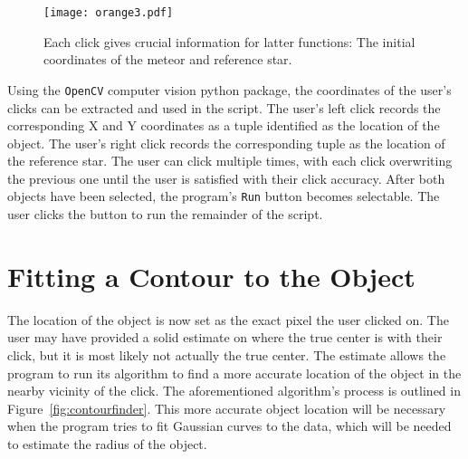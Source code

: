 \begin{figure}[h!]
	\centering
	\texttt{[image: orange3.pdf]}
	\caption{Each click gives crucial information for latter functions: The initial coordinates of the meteor and reference star.}
	\label{fig:clickfinder}
\end{figure}

Using the \texttt{OpenCV} computer vision python package, the coordinates of the user's clicks can be extracted and used in the script. The user's left click records the corresponding X and Y coordinates as a tuple identified as the location of the object. The user's right click records the corresponding tuple as the location of the reference star. The user can click multiple times, with each click overwriting the previous one until the user is satisfied with their click accuracy. After both objects have been selected, the program's \texttt{Run} button becomes selectable. The user clicks the button to run the remainder of the script.


\section{Fitting a Contour to the Object}
The location of the object is now set as the exact pixel the user clicked on. The user may have provided a solid estimate on where the true center is with their click, but it is most likely not actually the true center. The estimate allows the program to run its algorithm to find a more accurate location of the object in the nearby vicinity of the click. The aforementioned algorithm's process is outlined in Figure~\ref{fig:contourfinder}. This more accurate object location will be necessary when the program tries to fit Gaussian curves to the data, which will be needed to estimate the radius of the object.

